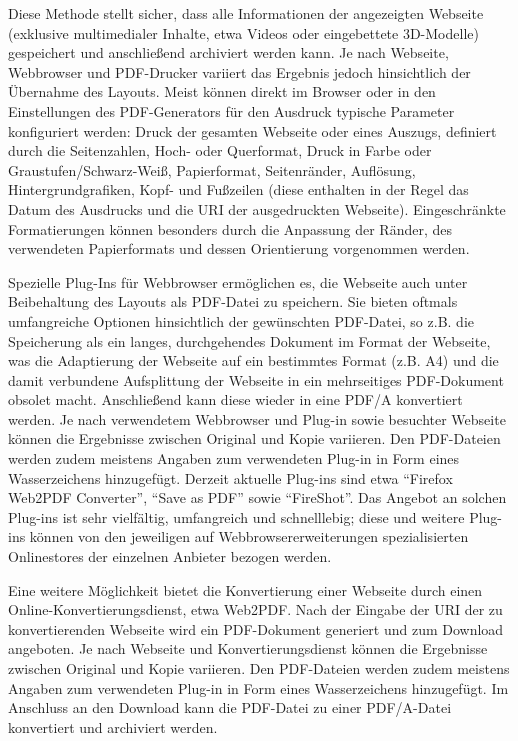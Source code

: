 Diese Methode stellt sicher, dass alle Informationen der angezeigten Webseite (exklusive multimedialer Inhalte, etwa Videos oder eingebettete 3D-Modelle) gespeichert und anschließend archiviert werden kann. Je nach Webseite, Webbrowser und PDF-Drucker variiert das Ergebnis jedoch hinsichtlich der Übernahme des Layouts. Meist können direkt im Browser oder in den Einstellungen des PDF-Generators für den Ausdruck typische Parameter konfiguriert werden: Druck der gesamten Webseite oder eines Auszugs, definiert durch die Seitenzahlen, Hoch- oder Querformat, Druck in Farbe oder Graustufen/Schwarz-Weiß, Papierformat, Seitenränder, Auflösung, Hintergrundgrafiken, Kopf- und Fußzeilen (diese enthalten in der Regel das Datum des Ausdrucks und die URI der ausgedruckten Webseite). Eingeschränkte Formatierungen können besonders durch die Anpassung der Ränder, des verwendeten Papierformats und dessen Orientierung vorgenommen werden. 

Spezielle Plug-Ins für Webbrowser ermöglichen es, die Webseite auch unter Beibehaltung des Layouts als PDF-Datei zu speichern. Sie bieten oftmals umfangreiche Optionen hinsichtlich der gewünschten PDF-Datei, so z.B. die Speicherung als ein langes, durchgehendes Dokument im Format der Webseite, was die Adaptierung der Webseite auf ein bestimmtes Format (z.B. A4) und die damit verbundene Aufsplittung der Webseite in ein mehrseitiges PDF-Dokument obsolet macht. Anschließend kann diese wieder in eine PDF/A konvertiert werden. Je nach verwendetem Webbrowser und Plug-in sowie besuchter Webseite können die Ergebnisse zwischen Original und Kopie variieren. Den PDF-Dateien werden zudem meistens Angaben zum verwendeten Plug-in in Form eines Wasserzeichens hinzugefügt. Derzeit aktuelle Plug-ins sind etwa "`Firefox Web2PDF Converter"', "`Save as PDF"' sowie "`FireShot"'. Das Angebot an solchen Plug-ins ist sehr vielfältig, umfangreich und schnelllebig; diese und weitere Plug-ins können von den jeweiligen auf Webbrowsererweiterungen spezialisierten Onlinestores der einzelnen Anbieter bezogen werden.

Eine weitere Möglichkeit bietet die Konvertierung einer Webseite durch einen Online-Konvertierungsdienst, etwa Web2PDF. Nach der Eingabe der URI der zu konvertierenden Webseite wird ein PDF-Dokument generiert und zum Download angeboten. Je nach Webseite und Konvertierungsdienst können die Ergebnisse zwischen Original und Kopie variieren. Den PDF-Dateien werden zudem meistens Angaben zum verwendeten Plug-in in Form eines Wasserzeichens hinzugefügt. Im Anschluss an den Download kann die PDF-Datei zu einer PDF/A-Datei konvertiert und archiviert werden. 

